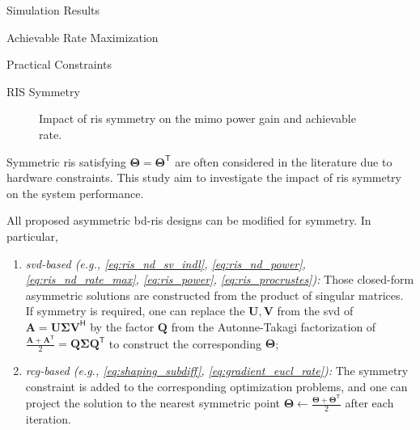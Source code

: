\documentclass[journal]{IEEEtran}
\begin{document}
\begin{section}{Simulation Results}
\begin{subsection}{Achievable Rate Maximization}
	\end{subsection}

	\begin{subsection}{Practical Constraints}
		\begin{subsubsection}{RIS Symmetry}
			\label{sc:ris_symmetry}
			\begin{figure}[!t]
				\centering
				\caption{
					Impact of \gls{ris} symmetry on the \gls{mimo} power gain and achievable rate.
				}
			\end{figure}
			Symmetric \gls{ris} satisfying $\mathbf{\Theta} = \mathbf{\Theta}^\mathsf{T}$ are often considered in the literature due to hardware constraints.
			This study aim to investigate the impact of \gls{ris} symmetry on the system performance.
			\begin{remark}
				All proposed asymmetric \gls{bd}-\gls{ris} designs can be modified for symmetry. In particular,
				\begin{enumerate}[label=(\roman*)]
					\item \emph{\gls{svd}-based (e.g., \eqref{eq:ris_nd_sv_indl}, \eqref{eq:ris_nd_power}, \eqref{eq:ris_nd_rate_max}, \eqref{eq:ris_power}, \eqref{eq:ris_procrustes}):} Those closed-form asymmetric solutions are constructed from the product of singular matrices. If symmetry is required, one can replace the $\mathbf{U}, \mathbf{V}$ from the \gls{svd} of $\mathbf{A} = \mathbf{U} \mathbf{\Sigma} \mathbf{V}^\mathsf{H}$ by the factor $\mathbf{Q}$ from the Autonne-Takagi factorization of $\frac{\mathbf{A} + \mathbf{A}^\mathsf{T}}{2} = \mathbf{Q} \mathbf{\Sigma} \mathbf{Q}^\mathsf{T}$ \cite{Ikramov2012} to construct the corresponding $\mathbf{\Theta}$; \label{it:takagi}
					\item \emph{\gls{rcg}-based (e.g., \eqref{eq:shaping_subdiff}, \eqref{eq:gradient_eucl_rate}):} The symmetry constraint is added to the corresponding optimization problems, and one can project the solution to the nearest symmetric point $\mathbf{\Theta} \gets \frac{\mathbf{\Theta} + \mathbf{\Theta}^\mathsf{T}}{2}$ after each iteration. \label{it:projection}
				\end{enumerate}
			\end{remark}


\end{subsubsection}
\end{subsection}
\end{section}
\end{document}

